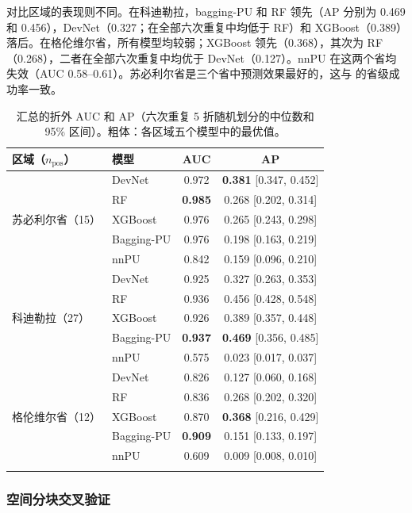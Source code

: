\documentclass[pdflatex,sn-apa]{sn-jnl}
\begin{document}
对比区域的表现则不同。在科迪勒拉，bagging-PU 和 RF 领先（AP 分别为 0.469 和 0.456），DevNet（0.327；在全部六次重复中均低于 RF）和 XGBoost（0.389）落后。在格伦维尔省，所有模型均较弱；XGBoost 领先（0.368），其次为 RF（0.268），二者在全部六次重复中均优于 DevNet（0.127）。nnPU 在这两个省均失效（AUC 0.58--0.61）。苏必利尔省是三个省中预测效果最好的，这与 \citet{Parsa2024} 的省级成功率一致。

\begin{table}[t]
\caption{汇总的折外 AUC 和 AP（六次重复 5 折随机划分的中位数和 95\% 区间）。粗体：各区域五个模型中的最优值。}\label{tab:benchmark}
\footnotesize
\begin{tabular*}{\textwidth}{@{\extracolsep\fill}llcc}
\toprule
区域（$n_{\mathrm{pos}}$） & 模型 & AUC & AP \\
\midrule
\multirow{5}{*}{苏必利尔省（15）} & DevNet & 0.972 & \textbf{0.381} [0.347, 0.452] \\
 & RF & \textbf{0.985} & 0.268 [0.202, 0.314] \\
 & XGBoost & 0.976 & 0.265 [0.243, 0.298] \\
 & Bagging-PU & 0.976 & 0.198 [0.163, 0.219] \\
 & nnPU & 0.842 & 0.159 [0.096, 0.210] \\
\midrule
\multirow{5}{*}{科迪勒拉（27）} & DevNet & 0.925 & 0.327 [0.263, 0.353] \\
 & RF & 0.936 & 0.456 [0.428, 0.548] \\
 & XGBoost & 0.926 & 0.389 [0.357, 0.448] \\
 & Bagging-PU & \textbf{0.937} & \textbf{0.469} [0.356, 0.485] \\
 & nnPU & 0.575 & 0.023 [0.017, 0.037] \\
\midrule
\multirow{5}{*}{格伦维尔省（12）} & DevNet & 0.826 & 0.127 [0.060, 0.168] \\
 & RF & 0.836 & 0.268 [0.202, 0.320] \\
 & XGBoost & 0.870 & \textbf{0.368} [0.216, 0.429] \\
 & Bagging-PU & \textbf{0.909} & 0.151 [0.133, 0.197] \\
 & nnPU & 0.609 & 0.009 [0.008, 0.010] \\
\botrule
\end{tabular*}
\end{table}

\subsubsection{空间分块交叉验证}\label{sec:res-spatial}
\end{document}
